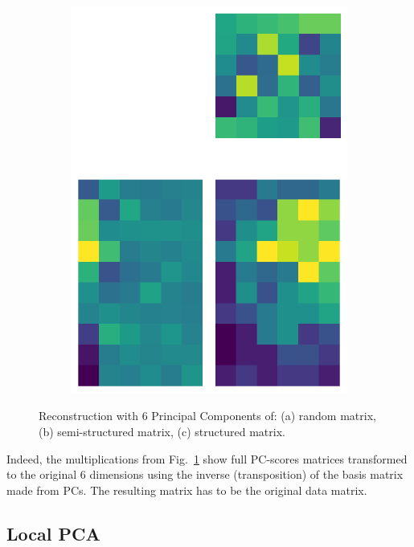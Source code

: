 \documentclass[10pt,twocolumn]{article}
\begin{document}
\begin{figure}[H]
\begin{subfigure}[t]{.15\textwidth}
\includegraphics[scale=.2]{structured-matrix-reconstruction-PCs-6.png}
\caption{ }
\end{subfigure}
\caption{Reconstruction with 6 Principal Components of: (a) random matrix, (b) semi-structured matrix, (c) structured matrix.}
\label{fig:matrices-reconstruction-6}
\end{figure}

Indeed, the multiplications from Fig.~\ref{fig:matrices-reconstruction-6} show full PC-scores matrices transformed to the original 6 dimensions using the inverse (transposition) of the basis matrix made from PCs. The resulting matrix has to be the original data matrix.



\subsection{Local PCA}
\end{document}
